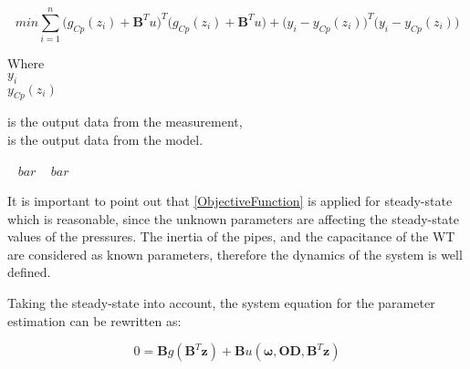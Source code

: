 %
%

 \begin{equation}
 min \sum_{i=1}^{n}\Big(g_{Cp}(z_i) + \pmb{B}^Tu\Big)^T \Big(g_{Cp}(z_i)     + \pmb{B}^Tu\Big) + \big(y_i - y_{Cp}(z_i)\big)^T  \big(y_i - y_{Cp}(z_i)\big)
  \label{ObjectiveFunction}
 \end{equation}
 
\begin{minipage}[t]{0.20\textwidth}
Where\\
\hspace*{8mm} $y_i$ \\
\hspace*{8mm} $y_{Cp}(z_i)$ 
\end{minipage}
\begin{minipage}[t]{0.68\textwidth}
\vspace*{2mm}
is the output data from the measurement,\\
is the output data from the model.
\end{minipage}
\begin{minipage}[t]{0.10\textwidth}
\vspace*{2mm}
\textcolor{White}{te}$\unit{bar}$
\textcolor{White}{te}$\unit{bar}$
\end{minipage}

It is important to point out that \eqref{ObjectiveFunction} is applied for steady-state which is reasonable, since the unknown parameters are affecting the steady-state values of the pressures. The inertia of the pipes, and the capacitance of the WT are considered as known parameters, therefore the dynamics of the system is well defined. 

Taking the steady-state into account, the system equation for the parameter estimation can be rewritten as: 

\begin{equation}
 0 = \pmb{B} g(\pmb{B}^T \pmb{z})+ \pmb{B} u(\pmb{\omega},\pmb{OD}, \pmb{B}^T \pmb{z})
 \label{InputOutputmodel_steadystate}
\end{equation}



%
 
